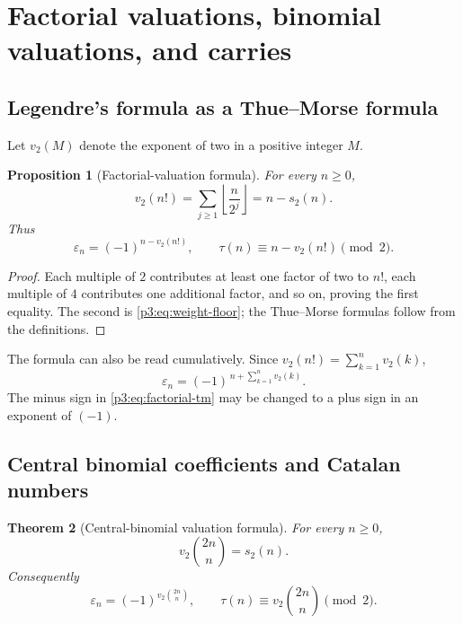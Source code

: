 \documentclass[11pt,oneside]{article}
\newtheorem{theorem}{Theorem}[section]
\newtheorem{proposition}[theorem]{Proposition}
\theoremstyle{definition}
\theoremstyle{remark}
\newcommand{\swt}{s_2}
\newcommand{\vtwo}{v_2}
\newcommand{\eps}{\varepsilon}
\newcommand{\1}{\mathbf 1}
\begin{document}
\section{Factorial valuations, binomial valuations, and carries}
\label{p3:sec:valuations}

\subsection{Legendre's formula as a Thue--Morse formula}

Let \(\vtwo(M)\) denote the exponent of two in a positive integer \(M\).

\begin{proposition}[Factorial-valuation formula]
\label{p3:prop:factorial-valuation}
For every \(n\ge0\),
\begin{equation}
 \vtwo(n!)=\sum_{j\ge1}\left\lfloor\frac n{2^j}\right\rfloor=n-\swt(n).
 \label{p3:eq:legendre2}
\end{equation}
Thus
\begin{equation}
 \boxed{
 \eps_n=(-1)^{n-\vtwo(n!)},
 \qquad
 \tau(n)\equiv n-\vtwo(n!)\pmod2.}
 \label{p3:eq:factorial-tm}
\end{equation}
\end{proposition}

\begin{proof}
Each multiple of \(2\) contributes at least one factor of two to \(n!\), each multiple of
\(4\) contributes one additional factor, and so on, proving the first equality.  The second
is \eqref{p3:eq:weight-floor}; the Thue--Morse formulas follow from the definitions.
\end{proof}

The formula can also be read cumulatively.  Since
\(\vtwo(n!)=\sum_{k=1}^{n}\vtwo(k)\),
\begin{equation}
 \eps_n=(-1)^{\,n+\sum_{k=1}^{n}\vtwo(k)}.
 \label{p3:eq:ruler-cumulative}
\end{equation}
The minus sign in \eqref{p3:eq:factorial-tm} may be changed to a plus sign in an exponent of
\((-1)\).

\subsection{Central binomial coefficients and Catalan numbers}

\begin{theorem}[Central-binomial valuation formula]
\label{p3:thm:central-binomial}
For every \(n\ge0\),
\begin{equation}
 \boxed{\vtwo\binom{2n}{n}=\swt(n)}.
 \label{p3:eq:central-v2}
\end{equation}
Consequently
\begin{equation}
 \boxed{
 \eps_n=(-1)^{\vtwo\binom{2n}{n}},
 \qquad
 \tau(n)\equiv\vtwo\binom{2n}{n}\pmod2.}
 \label{p3:eq:central-tm}
\end{equation}
\end{theorem}
\end{document}
